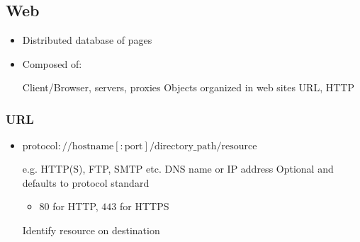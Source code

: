 \subsection{Web}
\begin{itemize}
    \item Distributed database of pages
    \item Composed of:
        \begin{itemize}
             Client/Browser, servers, proxies
             Objects organized in web sites
             URL, HTTP
        \end{itemize}
\end{itemize}

\subsubsection{URL}
\begin{itemize}
     address to a internet source
    \item $\text{protocol}://\text{hostname}[:\text{port}]/\text{directory\_path}/\text{resource}$
        \begin{itemize}
             e.g. HTTP(S), FTP, SMTP etc.
             DNS name or IP address
             Optional and defaults to protocol standard
                \begin{itemize}
                    \item $80$ for HTTP, $443$ for HTTPS
                \end{itemize}
                 Identify resource on destination
        \end{itemize}
\end{itemize}

